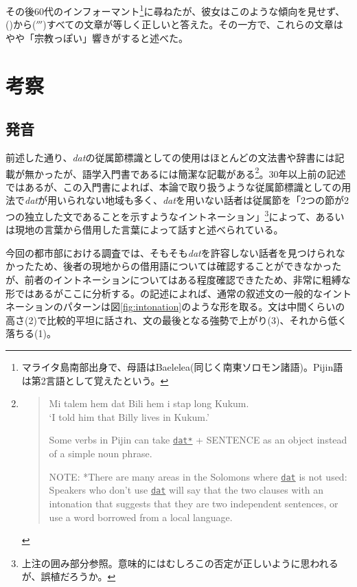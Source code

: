その後60代のインフォーマント\footnote{マライタ島南部出身で、母語はBaelelea(同じく南東ソロモン諸語)。Pijin語は第2言語として覚えたという。}に尋ねたが、彼女はこのような傾向を見せず、()から($'''$)すべての文章が等しく正しいと答えた。その一方で、これらの文章はやや「宗教っぽい」響きがすると述べた。

\section{考察}
\subsection{発音}
前述した通り、\textit{dat}の従属節標識としての使用はほとんどの文法書や辞書には記載が無かったが、語学入門書である\cite{eric}には簡潔な記載がある\footnote{
\cite{eric}\vspace{0.1in}
\begin{quote}
\begin{exe}
   Mi talem hem dat Bili hem i stap long Kukum. \\
  `I told him that Billy lives in Kukum.'
\end{exe}\vspace{0.1in}
Some verbs in Pijin can take \underline{\texttt{dat*}} + SENTENCE as an object instead of a simple noun phrase.
\begin{screen}
NOTE: *There are many areas in the Solomons where \underline{\texttt{dat}} is not used: Speakers who don't use \underline{\texttt{dat}} will say that the two clauses with an intonation that suggests that they are two independent sentences, or use a word borrowed from a local language.
\end{screen}
\end{quote}
}。30年以上前の記述ではあるが、この入門書によれば、本論で取り扱うような従属節標識としての用法で\textit{dat}が用いられない地域も多く、\textit{dat}を用いない話者は従属節を「2つの節が2つの独立した文であることを示すようなイントネーション」\footnote{上注の囲み部分参照。意味的にはむしろこの否定が正しいように思われるが、誤植だろうか。}によって、あるいは現地の言葉から借用した言葉によって話すと述べられている。

今回の都市部における調査では、そもそも\textit{dat}を許容しない話者を見つけられなかったため、後者の現地からの借用語については確認することができなかったが、前者のイントネーションについてはある程度確認できたため、非常に粗縛な形ではあるがここに分析する。\cite{eric}の記述によれば、通常の叙述文の一般的なイントネーションのパターンは図\ref{fig:intonation}のような形を取る。文は中間くらいの高さ(2)で比較的平坦に話され、文の最後となる強勢で上がり(3)、それから低く落ちる(1)。

